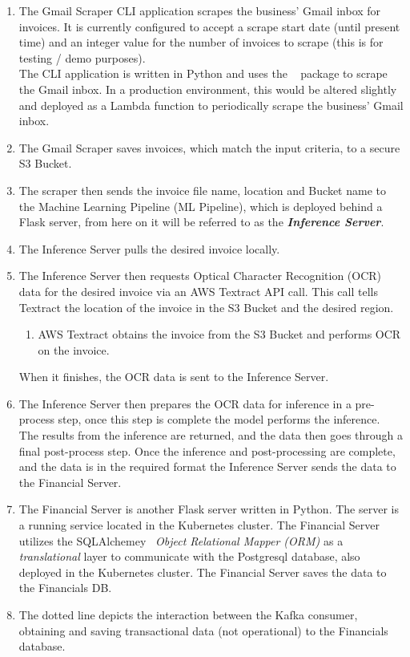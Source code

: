 \begin{enumerate} \label{enumerate:architecture}
	\item The Gmail Scraper CLI application scrapes the business' Gmail inbox for invoices.
	      It is currently configured to accept a scrape start date (until present time) and an
	      integer value for the number of invoices to scrape (this is for testing / demo purposes). \\
	      The CLI application is written in Python and uses the ~\autocite{rusevImboxPythonIMAP} package to scrape the
	      Gmail inbox.
	      \bigbreak
	      In a production environment, this would be altered slightly and deployed as a Lambda function
	      to periodically scrape the business' Gmail inbox.
	\item The Gmail Scraper saves invoices, which match the input criteria, to a secure S3 Bucket.
	\item The scraper then sends the invoice file name, location and Bucket name to the Machine Learning Pipeline (ML Pipeline),
	      which is deployed behind a Flask server, from here on it will be referred to as the \emph{\textbf{Inference Server}}.
	\item The Inference Server pulls the desired invoice locally.
	\item The Inference Server then requests Optical Character Recognition (OCR) data for the desired invoice via an AWS Textract API call.
	      This call tells Textract the location of the invoice in the S3 Bucket and the desired region.
	      \begin{enumerate}
		      \item AWS Textract obtains the invoice from the S3 Bucket and performs OCR on the invoice.
	      \end{enumerate}
	      When it finishes, the OCR data is sent to the Inference Server.
	\item The Inference Server then prepares the OCR data for inference in a pre-process step, once this step is complete the model
	      performs the inference.\\ The results from the inference are returned, and the data then goes through a final post-process step.
	      Once the inference and post-processing are complete, and the data is in the required format the Inference Server sends the data
	      to the Financial Server.
	\item The Financial Server is another Flask server written in Python. The server is a running service located in the Kubernetes cluster.
	      The Financial Server utilizes the SQLAlchemey~\autocite{SQLAlchemyDatabaseToolkit} \emph{Object Relational Mapper (ORM)} as a
	      \emph{translational} layer to communicate with the Postgresql database, also deployed in the Kubernetes cluster.
	      The Financial Server saves the data to the Financials DB.
	\item The dotted line depicts the interaction between the Kafka consumer, obtaining and saving transactional data (not operational) to the
	      Financials database.
\end{enumerate}
